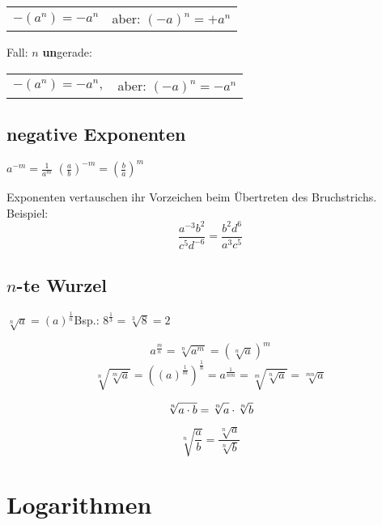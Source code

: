 \begin{multicols}{2}
\begin{samepage}
\begin{tabular}{cc}
 $-(a^n) = -a^n$ & aber: $(-a)^n = +a^n$
\end{tabular} 

Fall: $n$ \textbf{un}gerade:

\begin{tabular}{cc}
 $-(a^n) = -a^n,$ & aber: $(-a)^n = -a^n$
 \end{tabular} 
\end{samepage}

\subsection*{negative Exponenten}


$a^{-m} = \frac1{a^m}$ \hspace{2cm} $\left(\frac{a}b\right)^{-m} = \left(\frac{b}a\right)^m$


Exponenten vertauschen ihr Vorzeichen beim Übertreten des
Bruchstrichs. Beispiel:
$$\frac{a^{-3}b^2}{c^5d^{-6}} = \frac{b^2d^6}{a^3c^5}$$


\subsection*{$n$-te Wurzel}
$\sqrt[n]{a} = \left(a\right)^\frac1n$\hspace{2cm}Bsp.: $8^{\frac13}=\sqrt[3]{8}=2$

\begin{tcolorbox}[colback=white]
$$a^{\frac{m}n} = \sqrt[n]{a^m} = \left(\sqrt[n]a\right)^m$$
$$\sqrt[n]{\sqrt[m]{a}}   = \left((a)^\frac1m \right)^\frac1n =
  a^\frac1{nm} = \sqrt[m]{\sqrt[n]{a}}   = \sqrt[mn]{a}$$

  $$\sqrt[n]{a\cdot{}b} = \sqrt[n]{\vphantom{b}a} \cdot \sqrt[n]b$$

  $$\sqrt[n]{\frac{a}{b}} = \frac{\sqrt[n]a}{\sqrt[n]b}$$
\end{tcolorbox}

 
\hrulefill
\section*{Logarithmen}
\headerUndFooterJedeSeite{}


\end{multicols}
